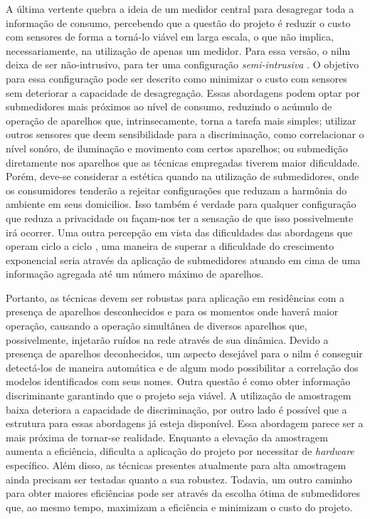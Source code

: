 A última vertente quebra a ideia de um medidor central para desagregar
toda a informação de consumo, percebendo que a questão do projeto é
reduzir o custo com sensores de forma a torná-lo viável em larga
escala, o que não implica, necessariamente, na utilização de apenas um
medidor. Para essa versão, o \gls{nilm} deixa de ser não-intrusivo,
para ter uma configuração \emph{semi-intrusiva}
\cite{seminilm_ihome_tomek_2012,seminilm_fhmm_empiricalnmeter_2013,
seminilm_berges_multisensor_2010}. O objetivo para essa configuração
pode ser descrito como minimizar o custo com sensores sem deteriorar a
capacidade de desagregação. Essas abordagens podem optar por
submedidores mais próximos ao nível de consumo, reduzindo o
acúmulo de operação de aparelhos que, intrinsecamente, torna a tarefa mais
simples; utilizar outros sensores que deem sensibilidade para a
discriminação, como correlacionar o nível sonóro, de iluminação e
movimento com certos aparelhos; ou submedição diretamente nos
aparelhos que as técnicas empregadas tiverem maior dificuldade. Porém,
deve-se considerar a estética quando na utilização de submedidores,
onde os consumidores tenderão a rejeitar configurações que reduzam a
harmônia do ambiente em seus domicilios. Isso também é verdade para
qualquer configuração que reduza a privacidade ou façam-nos ter a
sensação de que isso possivelmente irá ocorrer. Uma outra percepção em
vista das dificuldades das abordagens que operam ciclo a ciclo 
\cite{nilm_srinivasan_nn_2006_27,
nilm_itajuba_rodrigues,nilm_suzuki_2011_35}, uma maneira de superar a
dificuldade do crescimento exponencial seria através da aplicação de
submedidores atuando em cima de uma informação agregada até um número
máximo de aparelhos.

Portanto, as técnicas devem ser robustas para aplicação em residências
com a presença de aparelhos desconhecidos e para os momentos onde
haverá maior operação, causando a operação simultânea de diversos aparelhos
que, possivelmente, injetarão ruídos na rede através de sua dinâmica.
Devido a presença de aparelhos deconhecidos, um aspecto desejável para
o \gls{nilm} é conseguir detectá-los de maneira automática e de algum
modo possibilitar a correlação dos modelos identificados com seus
nomes. Outra questão é como obter informação discriminante garantindo
que o projeto seja viável. A utilização de amostragem baixa deteriora
a capacidade de discriminação, por outro lado é possível que a
estrutura para essas abordagens já esteja disponível. Essa abordagem
parece ser a mais próxima de tornar-se realidade. Enquanto a elevação
da amostragem aumenta a eficiência, dificulta a aplicação do projeto
por necessitar de \emph{hardware} específico. Além disso, as técnicas
presentes atualmente para alta amostragem ainda precisam ser testadas
quanto a sua robustez. Todavia, um outro caminho para obter maiores
eficiências pode ser através da escolha ótima de submedidores que, ao
mesmo tempo, maximizam a eficiência e minimizam o custo do projeto.

